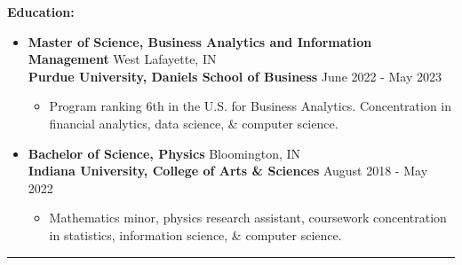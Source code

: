 \documentclass[letterpaper]{cream_class}
\begin{document}
\noindent\textcolor{burgundy}{\noindent\textbf{\large Education:}\\[-3ex]}
\vspace{-3pt}
\begin{itemize}[noitemsep, leftmargin=*]
  \item {\large\textbf{Master of Science, Business Analytics and Information Management}} \hfill West Lafayette, IN \\
        \textbf{Purdue University, Daniels School of Business} \hfill June 2022 - May 2023
    \begin{itemize}[noitemsep, leftmargin=*]
      \item Program ranking 6th in the U.S. for Business Analytics. Concentration in financial analytics, data science, \& computer science.
    \end{itemize}
  \item {\large\textbf{Bachelor of Science, Physics}} \hfill Bloomington, IN \\
        \textbf{Indiana University, College of Arts \& Sciences} \hfill August 2018 - May 2022
    \begin{itemize}[noitemsep, leftmargin=*]
      \item Mathematics minor, physics research assistant, coursework concentration in statistics, information science, \& computer science.
    \end{itemize}
\end{itemize}
\hrule
\vspace{6pt}
\end{document}
